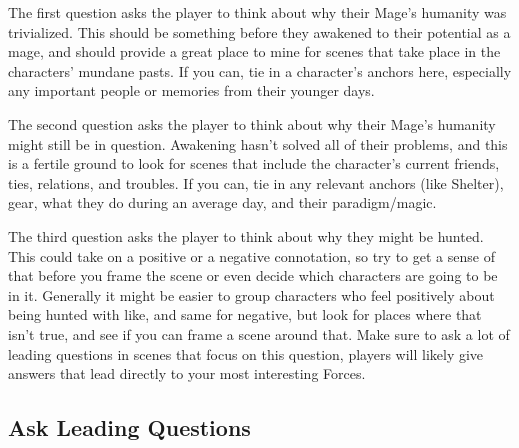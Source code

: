 \documentclass[
  oneside,
  statementpaper,
  9pt]{memoir}
\begin{document}
\begin{MC}

The first question asks the player to think about why their Mage’s humanity was trivialized. This should be something before they awakened to their potential as a mage, and should provide a great place to mine for scenes that take place in the characters’ mundane pasts. If you can, tie in a character’s anchors here, especially any important people or memories from their younger days.

The second question asks the player to think about why their Mage’s humanity might still be in question. Awakening hasn’t solved all of their problems, and this is a fertile ground to look for scenes that include the character’s current friends, ties, relations, and troubles. If you can, tie in any relevant anchors (like Shelter), gear, what they do during an average day, and their paradigm/magic.

The third question asks the player to think about why they might be hunted. This could take on a positive or a negative connotation, so try to get a sense of that before you frame the scene or even decide which characters are going to be in it. Generally it might be easier to group characters who feel positively about being hunted with like, and same for negative, but look for places where that isn’t true, and see if you can frame a scene around that. Make sure to ask a lot of leading questions in scenes that focus on this question, players will likely give answers that lead directly to your most interesting Forces.

\end{MC}

\hypertarget{ask-leading-questions}{%
\subsection{Ask Leading Questions}\label{ask-leading-questions}}
\end{document}
